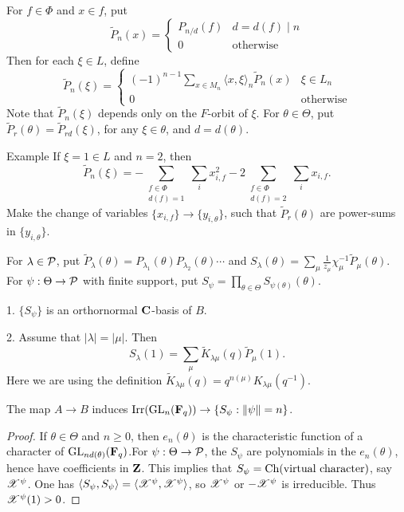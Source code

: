 For $f\in \Phi$ and $x\in f$, put 
\[
  \widetilde P_n(x) = \begin{cases} P_{n/d}(f) & d=d(f)\mid n \\ 0 & \text{otherwise} \end{cases}
\]
Then for each $\xi\in L$, define 
\[
  \widetilde P_n(\xi) = 
  \begin{cases}
    (-1)^{n-1} \sum_{x\in M_n} \langle x,\xi\rangle_n \widetilde P_n(x) & \xi\in L_n \\ 0 & \text{otherwise} 
  \end{cases}
\]
Note that $\widetilde P_n(\xi)$ depends only on the $F$-orbit of $\xi$. For 
$\theta\in \Theta$, put $\widetilde P_r(\theta) = \widetilde P_{rd}(\xi)$, for 
any $\xi\in \theta$, and $d=d(\theta)$. 

\begin{enonce}[remark]{Example}
If $\xi=1\in L$ and $n=2$, then 
\[
  \widetilde P_n(\xi) = - \sum_{\substack{f\in \Phi \\ d(f)=1}} \sum_i x_{i,f}^2 - 2 \sum_{\substack{f\in \Phi \\ d(f) = 2}} \sum_i x_{i,f} .
\]
Make the change of variables $\{x_{i,f}\} \to \{y_{i,\theta}\}$, such that 
$\widetilde P_r(\theta)$ are power-sums in $\{y_{i,\theta}\}$. 
\end{enonce}

For $\lambda\in \mathcal{P}$, put 
$\widetilde P_\lambda(\theta) = P_{\lambda_1}(\theta) P_{\lambda_2}(\theta) \dotsm$ and 
$S_\lambda(\theta) = \sum_\mu \frac{1}{z_\mu} \chi_\mu^{-1} \widetilde P_\mu(\theta)$. 
For $\psi:\Theta \to \mathcal{P}$ with finite support, put 
$S_\psi = \prod_{\theta\in \Theta} S_{\psi(\theta)}(\theta)$. 

\begin{prop}
1. $\{S_\psi\}$ is an orthornormal $\mathbf{C}$-basis of $B$. 

2. Assume that $|\lambda|=|\mu|$. Then 
\[
  S_\lambda(1) = \sum_\mu \widetilde K_{\lambda\mu}(q) \widetilde P_\mu(1) .
\]
Here we are using the definition 
$\widetilde K_{\lambda\mu}(q) = q^{n(\mu)} K_{\lambda\mu}(q^{-1})$. 
\end{prop}


\begin{theo}
The map $A\to B$ induces 
$\operatorname{Irr}(\operatorname{GL}_n(\mathbf{F}_q)) \to\{S_\psi:\|\psi\| = n\}$. 
\end{theo}
\begin{proof}
If $\theta\in \Theta$ and $n\geqslant 0$, then $e_n(\theta)$ is the characteristic 
function of a character of $\operatorname{GL}_{nd(\theta)}(\mathbf{F}_q)$.For 
$\psi:\Theta\to \mathcal{P}$, the $S_\psi$ are polynomials in the $e_n(\theta)$, hence 
have coefficients in $\mathbf{Z}$. This implies that 
$S_\psi=\operatorname{Ch}(\text{virtual character})$, say $\mathscr{X}^\psi$. One has 
$\langle S_\psi,S_\psi\rangle = \langle \mathscr{X}^\psi,\mathscr{X}^\psi\rangle$, so 
$\mathscr{X}^\psi$ or $-\mathscr{X}^\psi$ is irreducible. Thus $\mathscr{X}^\psi(1)>0$. 
\end{proof}

